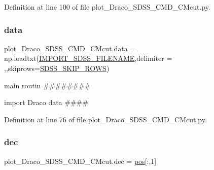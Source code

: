 Definition at line 100 of file plot\+\_\+\+Draco\+\_\+\+S\+D\+S\+S\+\_\+\+C\+M\+D\+\_\+\+C\+Mcut.\+py.

\mbox{\label{namespaceplot__Draco__SDSS__CMD__CMcut_a06b020e30f5517df354b6f8db8d1e22d}} 
\subsubsection{\texorpdfstring{data}{data}}
{\footnotesize\ttfamily plot\+\_\+\+Draco\+\_\+\+S\+D\+S\+S\+\_\+\+C\+M\+D\+\_\+\+C\+Mcut.\+data = np.\+loadtxt(\hyperlink{namespaceplot__Draco__SDSS__CMD__CMcut_a831c14a92a01b5c37b46393599122c71}{I\+M\+P\+O\+R\+T\+\_\+\+S\+D\+S\+S\+\_\+\+F\+I\+L\+E\+N\+A\+ME},delimiter = \textquotesingle{},\textquotesingle{},skiprows=\hyperlink{namespaceplot__Draco__SDSS__CMD__CMcut_a77aba141d44a10aa841629c09bb35e86}{S\+D\+S\+S\+\_\+\+S\+K\+I\+P\+\_\+\+R\+O\+WS})}



main routin \#\#\#\#\#\#\#\# 

import Draco data \#\#\#\# 

Definition at line 76 of file plot\+\_\+\+Draco\+\_\+\+S\+D\+S\+S\+\_\+\+C\+M\+D\+\_\+\+C\+Mcut.\+py.

\mbox{\label{namespaceplot__Draco__SDSS__CMD__CMcut_ac51d42ccd172a5b9e65f9c86aa8db55d}} 
\subsubsection{\texorpdfstring{dec}{dec}}
{\footnotesize\ttfamily plot\+\_\+\+Draco\+\_\+\+S\+D\+S\+S\+\_\+\+C\+M\+D\+\_\+\+C\+Mcut.\+dec = \hyperlink{namespaceplot__Draco__SDSS__CMD__CMcut_a455b43c2b64fee5163e0a175c6313229}{pos}\mbox{[}\+:,1\mbox{]}}



